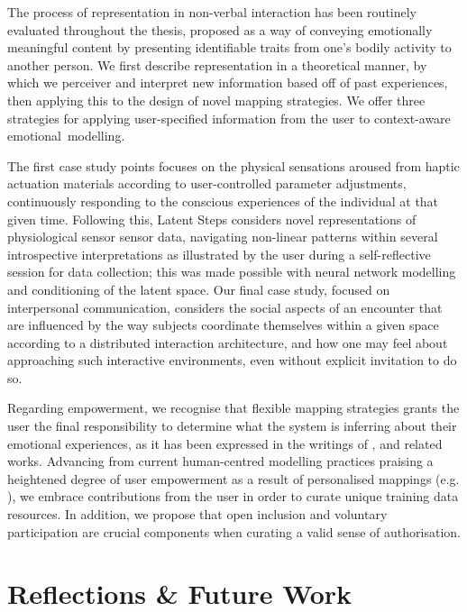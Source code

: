 The process of representation in non-verbal interaction has been routinely evaluated throughout the thesis, proposed as a way of conveying emotionally meaningful content by presenting identifiable traits from one's bodily activity to another person. We first describe representation in a theoretical manner, by which we perceiver and interpret new information based off of past experiences, then applying this to the design of novel mapping strategies. We offer three strategies for applying user-specified information from the user to context-aware emotional~modelling.

The first case study points focuses on the physical sensations aroused from haptic actuation materials according to user-controlled parameter adjustments, continuously responding to the conscious experiences of the individual at that given time. Following this, Latent Steps considers novel representations of physiological sensor sensor data, navigating non-linear patterns within several introspective interpretations as illustrated by the user during a self-reflective session for data collection; this was made possible with neural network modelling and conditioning of the latent space. Our final case study, focused on interpersonal communication, considers the social aspects of an encounter that are influenced by the way subjects coordinate themselves within a given space according to a distributed interaction architecture, and how one may feel about approaching such interactive environments, even without explicit invitation to do so.

Regarding empowerment, we recognise that flexible mapping strategies grants the user the final responsibility to determine what the system is inferring about their emotional experiences, as it has been expressed in the writings of \citeauthor{stahl_evocative_2014} \cite{stahl_evocative_2014}, and related works. Advancing from current human-centred modelling practices praising a heightened degree of user empowerment as a result of personalised mappings (e.g. \cite{carney_teachable_2020}), we embrace contributions from the user in order to curate unique training data resources. In addition, we propose that open inclusion and voluntary participation are crucial components when curating a valid sense of authorisation.

\section{Reflections \& Future Work}
\label{sec:reflections}

